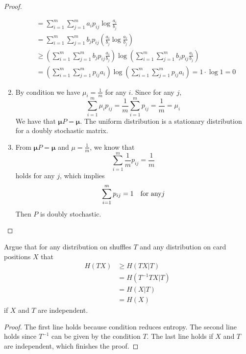 \begin{exercise}
\begin{proof}
\begin{enumerate}
{\begin{equation}
\begin{aligned}
          &= \sum_{i=1}^{m} \sum_{j=1}^{m} a_i  p_{ij}\log \frac{a_i}{b_j} \\
          &= \sum_{i=1}^{m} \sum_{j=1}^{m} b_j  p_{ij} \left(\frac{a_i}{b_j} \log \frac{a_i}{b_j} \right) \\
          &\ge \left(\sum_{i=1}^{m} \sum_{j=1}^{m} b_j  p_{ij} \frac{a_i}{b_j} \right) \log \left(\sum_{i=1}^{m} \sum_{j=1}^{m} b_j  p_{ij} \frac{a_i}{b_j} \right) \\
          &= \left(\sum_{i=1}^{m} \sum_{j=1}^{m} p_{ij} a_i\right) \log \left(\sum_{i=1}^{m} \sum_{j=1}^{m} p_{ij} a_i\right) = 1 \cdot \log 1 = 0
        \end{aligned}
      \end{equation}
    }
    \item {
     By condition we have $\mu_i = \frac{1}{m}$ for any $i$. Since for any $j$, 
     \begin{equation}
      \sum_{i=1}^{m} \mu_i p_{ij} = \frac{1}{m} \sum_{i=1}^{m} p_{ij} = \frac{1}{m} = \mu_i
     \end{equation}
     We have that $\mathbf{\mu} P = \mathbf{\mu}$. The uniform distribution is a stationary distribution for a doubly stochastic matrix.
    }
    \item {
      From $\mathbf{\mu} P = \mathbf{\mu}$ and $\mu = \frac{1}{m}$, we know that
      \begin{equation}
        \sum_{i=1}^{m} \frac{1}{m} p_{ij} = \frac{1}{m}
       \end{equation}
      holds for any $j$, which implies
      \begin{equation}
        \sum_{i=1}^{m} p_{ij} = 1 \text{\quad for any} j
      \end{equation}
      Then $P$ is doubly stochastic.
    }
  \end{enumerate}
  \end{proof}
  \label{ex4-8}
\end{exercise}

\begin{exercise}{ Argue that for any distribution on shuffles $T$ and any distribution on card positions $X$ that
  $$
  \begin{aligned}
  H(T X) & \geq H(T X | T) \\
  &=H\left(T^{-1} T X | T\right) \\
  &=H(X | T) \\
  &=H(X)
  \end{aligned}
  $$
  if $X$ and $T$ are independent.}
  \begin{proof} The first line holds because condition reduces entropy. The second line holds since $T^{-1}$ can be given by the condition $T$. The last line holds if $X$ and $T$ are independent, which finishes the proof.
  \end{proof}
  \label{ex4-9}
\end{exercise}

